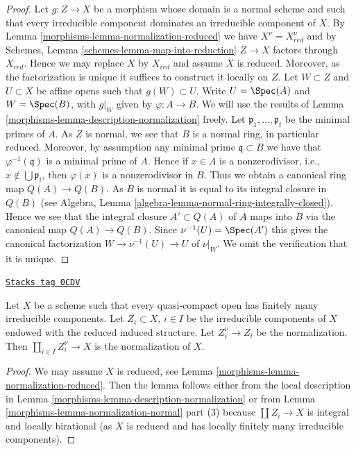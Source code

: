 \begin{proof}
\medskip\noindent
Let $g : Z \to X$ be a morphism whose domain is a normal scheme
and such that every irreducible component dominates an irreducible
component of $X$. By Lemma \ref{morphisms-lemma-normalization-reduced}
we have $X^\nu = X_{red}^\nu$ and by
Schemes, Lemma \ref{schemes-lemma-map-into-reduction}
$Z \to X$ factors through $X_{red}$. Hence we may replace $X$ by
$X_{red}$ and assume $X$ is reduced. Moreover, as the factorization
is unique it suffices to construct it locally on $Z$.
Let $W \subset Z$ and $U \subset X$ be affine opens
such that $g(W) \subset U$. Write $U = \Spec(A)$ and
$W = \Spec(B)$, with $g|_W$ given by $\varphi : A \to B$.
We will use the results of Lemma \ref{morphisms-lemma-description-normalization} freely.
Let $\mathfrak p_1, \ldots, \mathfrak p_t$ be the minimal primes of $A$.
As $Z$ is normal, we see that $B$ is a normal
ring, in particular reduced. Moreover, by assumption any minimal
prime $\mathfrak q \subset B$ we have that $\varphi^{-1}(\mathfrak q)$
is a minimal prime of $A$. Hence if $x \in A$ is a nonzerodivisor, i.e.,
$x \not \in \bigcup \mathfrak p_i$, then $\varphi(x)$ is a nonzerodivisor
in $B$. Thus we obtain a canonical ring map $Q(A) \to Q(B)$. As $B$ is
normal it is equal to its integral closure in $Q(B)$ (see
Algebra, Lemma \ref{algebra-lemma-normal-ring-integrally-closed}).
Hence we see that the integral closure $A' \subset Q(A)$ of $A$
maps into $B$ via the canonical map $Q(A) \to Q(B)$.
Since $\nu^{-1}(U) = \Spec(A')$ this gives the canonical
factorization $W \to \nu^{-1}(U) \to U$ of $\nu|_W$.
We omit the verification that it is unique.
\end{proof}

\begin{lemma}
\label{morphisms-lemma-normalization-in-terms-of-components}
\href{https://stacks.math.columbia.edu/tag/0CDV}{\texttt{Stacks tag 0CDV}}

Let $X$ be a scheme such that every quasi-compact open has
finitely many irreducible components. Let $Z_i \subset X$, $i \in I$
be the irreducible components of $X$ endowed with the reduced
induced structure. Let $Z_i^\nu \to Z_i$ be the normalization.
Then $\coprod_{i \in I} Z_i^\nu \to X$ is the normalization of $X$.
\end{lemma}

\begin{proof}

We may assume $X$ is reduced, see Lemma \ref{morphisms-lemma-normalization-reduced}.
Then the lemma follows either from the local description in
Lemma \ref{morphisms-lemma-description-normalization}
or from Lemma \ref{morphisms-lemma-normalization-normal} part (3) because
$\coprod Z_i \to X$ is integral and locally birational (as $X$ is reduced
and has locally finitely many irreducible components).
\end{proof}


